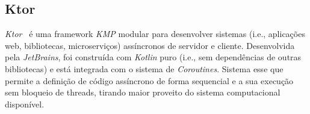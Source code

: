 \subsection{Ktor}\label{subsec:ktor}

\textit{Ktor}~\cite{ktor} é uma framework \textit{KMP} modular para desenvolver sistemas (i.e., aplicações web, bibliotecas, microserviços) assíncronos de servidor e cliente.
Desenvolvida pela \textit{JetBrains}, foi construída com \textit{Kotlin} puro (i.e., sem dependências de outras bibliotecas) e está integrada com o sistema de \textit{Coroutines}.
Sistema esse que permite a definição de
código assíncrono de forma sequencial e a sua execução sem bloqueio de threads, tirando maior proveito do sistema computacional disponível.
